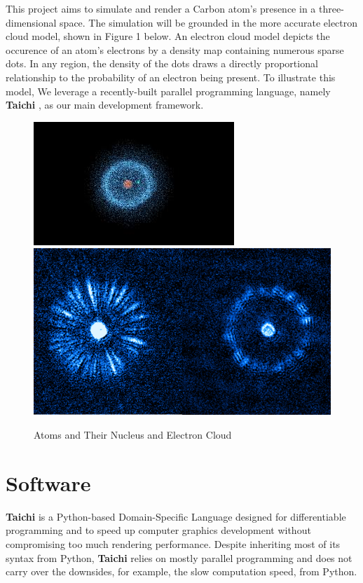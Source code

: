 \documentclass[acmtog]{acmart}
\begin{document}
This project aims to simulate and render a Carbon atom's presence in a three-dimensional space. The simulation will be grounded in the more accurate electron cloud model, shown in Figure 1 below. An electron cloud model depicts the occurence of an atom's electrons by a density map containing numerous sparse dots. In any region, the density of the dots draws a directly proportional relationship to the probability of an electron being present. To illustrate this model, We leverage a recently-built parallel programming language, namely \textbf{Taichi} \cite{hu2019taichi}, as our main development framework.

\begin{figure}[h]
  \centering
  \includegraphics[width=\linewidth]{./concept_1.jpeg}
  \includegraphics[width=\linewidth]{./concept_2.png}
  \caption{Atoms and Their Nucleus and Electron Cloud}
\end{figure}

\section{Software}
\textbf{Taichi} is a Python-based Domain-Specific Language designed for differentiable programming and to speed up computer graphics development without compromising too much rendering performance. Despite inheriting most of its syntax from Python, \textbf{Taichi} relies on mostly parallel programming and does not carry over the downsides, for example, the slow computation speed, from Python.
\end{document}
